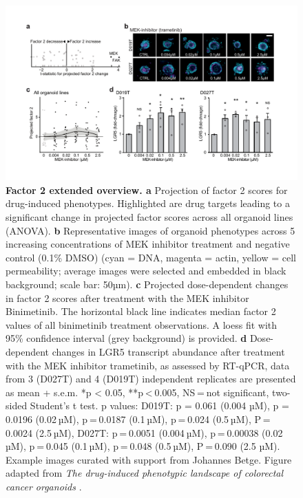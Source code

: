 \begin{flushleft}
\begin{figure}[h!]
\centering
\includegraphics[width=\textwidth,
                height=\textheight,
                keepaspectratio]{figures/promise/pdf/fig_5_3.pdf}
\caption[Factor 2 extended overview]{\textbf{Factor 2 extended overview. a} Projection of factor 2 scores for drug-induced phenotypes. Highlighted are drug targets leading to a significant change in projected factor scores across all organoid lines (ANOVA). \textbf{b} Representative images of organoid phenotypes across 5 increasing concentrations of MEK inhibitor treatment and negative control (0.1\% DMSO) (cyan = DNA, magenta = actin, yellow = cell permeability; average images were selected and embedded in black background; scale bar: 50µm). \textbf{c} Projected dose-dependent changes in factor 2 scores after treatment with the MEK inhibitor Binimetinib. The horizontal black line indicates median factor 2 values of all binimetinib treatment observations. A loess fit with 95\% confidence interval (grey background) is provided. \textbf{d} Dose-dependent changes in LGR5 transcript abundance after treatment with the MEK inhibitor trametinib, as assessed by RT-qPCR, data from 3 (D027T) and 4 (D019T) independent replicates are presented as mean + s.e.m. *p < 0.05, **p < 0.005, NS = not significant, two-sided Student’s t test. p values: D019T: p = 0.061 (0.004 µM), p = 0.0196 (0.02 µM), p = 0.0187 (0.1 µM), p = 0.024 (0.5 µM), P = 0.0024 (2.5 µM), D027T: p = 0.0051 (0.004 µM), p = 0.00038 (0.02 µM), p = 0.045 (0.1 µM), p = 0.048 (0.5 µM), P = 0.090 (2.5 µM). Example images curated with support from Johannes Betge. Figure adapted from \textit{The drug-induced phenotypic landscape of colorectal cancer organoids} \citep{betgeDruginducedPhenotypicLandscape2022}.}
\label{fig_253}
\end{figure}
\bigbreak


\end{flushleft}
